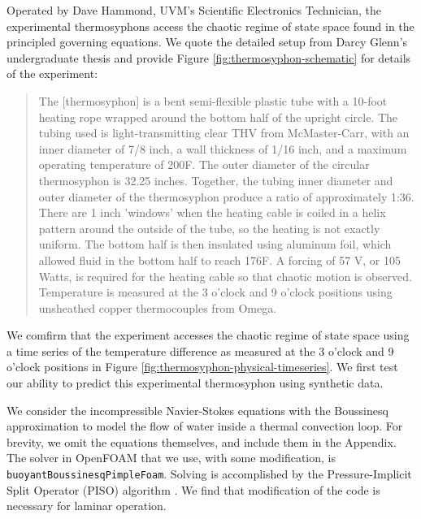 Operated by Dave Hammond, UVM's Scientific Electronics Technician, the experimental thermosyphons access the chaotic regime of state space found in the principled governing equations.
We quote the detailed setup from Darcy Glenn's undergraduate thesis \cite{glenn2013} and provide Figure \ref{fig:thermosyphon-schematic} for details of the experiment:
\begin{quote}
The [thermosyphon] is a bent semi-flexible plastic tube with a 10-foot heating rope wrapped around the bottom half of the upright circle.
The tubing used is light-transmitting clear THV from McMaster-Carr, with an inner diameter of 7/8 inch, a wall thickness of 1/16 inch, and a maximum operating temperature of 200F.
The outer diameter of the circular thermosyphon is 32.25 inches.
Together, the tubing inner diameter and outer diameter of the thermosyphon produce a ratio of approximately 1:36.
There are 1 inch 'windows' when the heating cable is coiled in a helix pattern around the outside of the tube, so the heating is not exactly uniform.
The bottom half is then insulated using aluminum foil, which allowed fluid in the bottom half to reach 176F.
A forcing of 57 V, or 105 Watts, is required for the heating cable so that chaotic motion is observed.
Temperature is measured at the 3 o'clock and 9 o'clock positions using unsheathed copper thermocouples from Omega.
\end{quote}
We comfirm that the experiment accesses the chaotic regime of state space using a time series of the temperature difference as measured at the 3 o'clock and 9 o'clock positions in Figure \ref{fig:thermosyphon-physical-timeseries}.
We first test our ability to predict this experimental thermosyphon using synthetic data.

We consider the incompressible Navier-Stokes equations with the Boussinesq approximation to model the flow of water inside a thermal convection loop.
For brevity, we omit the equations themselves, and include them in the Appendix.
The solver in OpenFOAM that we use, with some modification, is \verb|buoyantBoussinesqPimpleFoam|.
Solving is accomplished by the Pressure-Implicit Split Operator (PISO) algorithm \cite{issa1986solution}.
We find that modification of the code is necessary for laminar operation.


